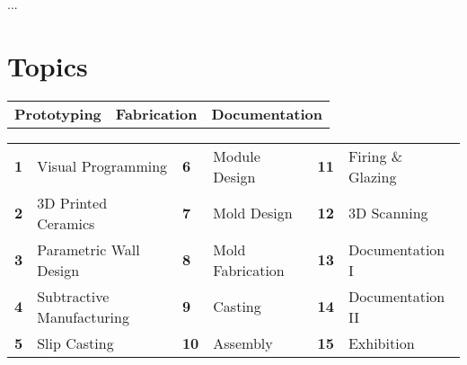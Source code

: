 \documentclass[11pt,article,oneside]{memoir}
\begin{document}
...
\\


\section{Topics}
%
\begin{table}[H]
\begin{tabular}{l @{\hskip 3.5cm} l @{\hskip 2.2cm} l}
\textbf{Prototyping} & \textbf{Fabrication} & \textbf{Documentation}\\
\end{tabular}
\end{table}
%
\vspace*{-1em}
%
\begin{table}[H]
\begin{tabular}{l l l l l l}
\small
\textbf{1} & Visual Programming  & \textbf{6} & Module Design & \textbf{11} & Firing \& Glazing\\
\textbf{2} & 3D Printed Ceramics & \textbf{7} & Mold Design & \textbf{12} & 3D Scanning\\
\textbf{3} & Parametric Wall Design & \textbf{8} & Mold Fabrication & \textbf{13} & Documentation I\\
\textbf{4} & Subtractive Manufacturing & \textbf{9} & Casting & \textbf{14} & Documentation II\\
\textbf{5} & Slip Casting & \textbf{10} & Assembly & \textbf{15} & Exhibition\\
\end{tabular}
\end{table}

\clearpage
\end{document}
